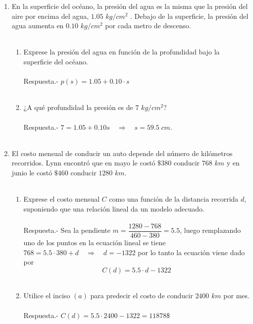 \begin{enumerate}
    \item En la superficie del océano, la presión del agua es la misma que la presión del aire por encima del agua, $1.05$ $kg/cm^2$ . Debajo de la superficie, la presión del agua aumenta en $0.10$ $kg/cm^2$ por cada metro de descenso.\\\\
    \begin{enumerate}[\bfseries (a)]

	\item Exprese la presión del agua en función de la profundidad bajo la superficie del océano.\\\\
	    Respuesta.-\; $p(s) = 1.05 + 0.10\cdot s$\\\\
	
	\item ¿A qué profundidad la presión es de $7$ $kg/cm^2$?\\\\
	    Respuesta.-\; $7=1.05 + 0.10 s \quad \Rightarrow \quad s =  59.5 \; cm$.\\\\

    \end{enumerate}

    \item El costo mensual de conducir un auto depende del número de kilómetros recorridos. Lynn encontró que en mayo le costó $ \$380$ conducir $768$ $km$ y en junio le costó $\$460$ conducir $1280$ $km$.\\\\
    \begin{enumerate}[\bfseries (a)]

	\item Exprese el costo mensual $C$ como una función de la distancia recorrida $d$, suponiendo que una relación lineal da un modelo adecuado.\\\\
	    Respuesta.-\; Sea la pendiente $m=\dfrac{1280-768}{460-380}= 5.5$, luego remplazando uno de los puntos en la ecuación lineal se tiene $768 = 5.5\cdot 380 + d \quad \Rightarrow \quad d=-1322$ por lo tanto  la ecuación viene dado por $$C(d)=5.5\cdot d - 1322$$\\

	\item Utilice el inciso $(a)$ para predecir el costo de conducir $2400$ $km$ por mes.\\\\
	    Respuesta.-\; $C(d)=5.5\cdot 2400 - 1322 = 11878 \$ $ \\\\


\end{enumerate}
\end{enumerate}
